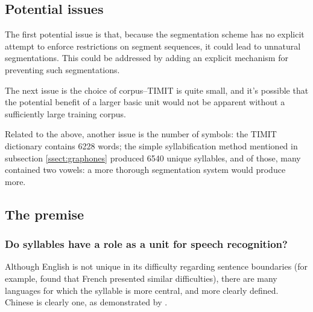 \documentclass{article}[11pt]
\begin{document}
\subsection{Potential issues}
\label{ssect:issues}

The first potential issue is that, because the segmentation scheme has no explicit attempt to enforce restrictions on segment sequences, it could lead to unnatural segmentations. This could be addressed by adding an explicit mechanism for preventing such segmentations.

The next issue is the choice of corpus--TIMIT is quite small, and it's possible that the potential benefit of a larger basic unit would not be apparent without a sufficiently large training corpus.

Related to the above, another issue is the number of symbols: the TIMIT dictionary contains 6228 words; the simple syllabification method mentioned in subsection \ref{ssect:graphones} produced 6540 unique syllables, and of those, many contained two vowels: a more thorough segmentation system would produce more.



\subsection{The premise}
\label{ssect:premise}

\subsubsection{Do syllables have a role as a unit for speech recognition?}

Although English is not unique in its difficulty regarding sentence boundaries (for example, \citet{goslin_comparing_2007} found that French presented similar difficulties), there are many languages for which the syllable is more central, and more clearly defined. Chinese is clearly one, as demonstrated by \citet{dong_cif_2020}.
\end{document}
